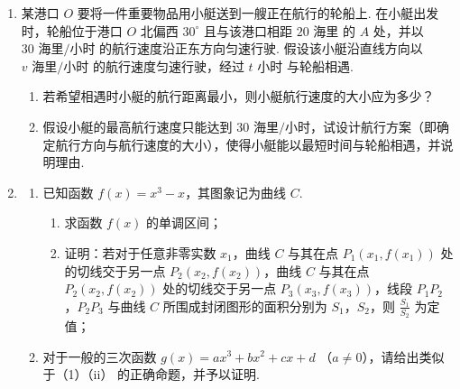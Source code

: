 \begin{description}
\begin{enumerate}[leftmargin=5pt]
        \item 某港口 \(O\) 要将一件重要物品用小艇送到一艘正在航行的轮船上. 在小艇出发时，轮船位于港口 \(O\) 北偏西 \(30^{\circ}\) 且与该港口相距 \(20\text{ 海里}\) 的 \(A\) 处，并以 \(30\text{ 海里/小时}\) 的航行速度沿正东方向匀速行驶. 假设该小艇沿直线方向以 \(v\text{ 海里/小时}\) 的航行速度匀速行驶，经过 \(t\text{ 小时}\) 与轮船相遇.
\begin{enumerate}
\item 若希望相遇时小艇的航行距离最小，则小艇航行速度的大小应为多少？
\item 假设小艇的最高航行速度只能达到 \(30\text{ 海里/小时}\)，试设计航行方案（即确定航行方向与航行速度的大小），使得小艇能以最短时间与轮船相遇，并说明理由.
\end{enumerate}

        \item \begin{enumerate}
\item 已知函数 \( f(x) = x^3 - x \)，其图象记为曲线 \(C\).
    \begin{enumerate}
    \item 求函数 \( f(x) \) 的单调区间；
    \item 证明：若对于任意非零实数 \(x_{1}\)，曲线 \(C\) 与其在点 \(P_{1}(x_{1}, f(x_{1}))\) 处的切线交于另一点 \(P_{2}(x_{2}, f(x_{2}))\)，曲线 \(C\) 与其在点 \(P_{2}(x_{2}, f(x_{2}))\) 处的切线交于另一点 \(P_{3}(x_{3}, f(x_{3}))\)，线段 \(P_{1}P_{2}\)，\(P_{2}P_{3}\) 与曲线 \(C\) 所围成封闭图形的面积分别为 \(S_{1}\)，\(S_{2}\)，则 \(\frac{S_{1}}{S_{2}}\) 为定值；
    \end{enumerate}
\item 对于一般的三次函数 \( g(x) = ax^3 + bx^2 + cx + d \) （\(a \neq 0\)），请给出类似于（1）（ii） 的正确命题，并予以证明.
\end{enumerate}

    \end{enumerate}

\end{description}

